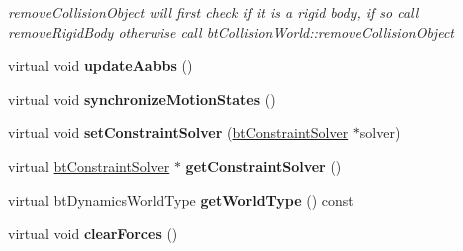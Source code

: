 \begin{DoxyCompactItemize}
\begin{DoxyCompactList}\small\item\em remove\+Collision\+Object will first check if it is a rigid body, if so call remove\+Rigid\+Body otherwise call bt\+Collision\+World\+::remove\+Collision\+Object \end{DoxyCompactList}\item 
\mbox{\label{classbtSimpleDynamicsWorld_a5d6904f3e920cb71758037b41bf7a325}} 
virtual void {\bfseries update\+Aabbs} ()
\item 
\mbox{\label{classbtSimpleDynamicsWorld_a70e168909def885fddf4c4e28322435f}} 
virtual void {\bfseries synchronize\+Motion\+States} ()
\item 
\mbox{\label{classbtSimpleDynamicsWorld_a8945afb676dd71ee2fb58d823384500a}} 
virtual void {\bfseries set\+Constraint\+Solver} (\hyperlink{classbtConstraintSolver}{bt\+Constraint\+Solver} $\ast$solver)
\item 
\mbox{\label{classbtSimpleDynamicsWorld_a9ae30c37ffd9ac512a8afb701322752d}} 
virtual \hyperlink{classbtConstraintSolver}{bt\+Constraint\+Solver} $\ast$ {\bfseries get\+Constraint\+Solver} ()
\item 
\mbox{\label{classbtSimpleDynamicsWorld_af1ae6896a3bb3dc5adf68482b3a1c785}} 
virtual bt\+Dynamics\+World\+Type {\bfseries get\+World\+Type} () const
\item 
\mbox{\label{classbtSimpleDynamicsWorld_a536b02f63af0a53253b651d6194ef674}} 
virtual void {\bfseries clear\+Forces} ()
\end{DoxyCompactItemize}
